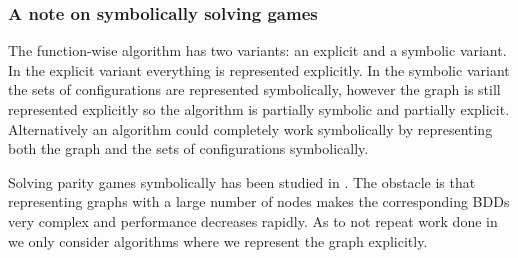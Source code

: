 \subsubsection{A note on symbolically solving games}
The function-wise algorithm has two variants: an explicit and a symbolic variant. In the explicit variant everything is represented explicitly. In the symbolic variant the sets of configurations are represented symbolically, however the graph is still represented explicitly so the algorithm is partially symbolic and partially explicit. Alternatively an algorithm could completely work symbolically by representing both the graph and the sets of configurations symbolically.

Solving parity games symbolically has been studied in \cite{BDDSolvingPG}. The obstacle is that representing graphs with a large number of nodes makes the corresponding BDDs very complex and performance decreases rapidly. As to not repeat work done in \cite{BDDSolvingPG} we only consider algorithms where we represent the graph explicitly. 


